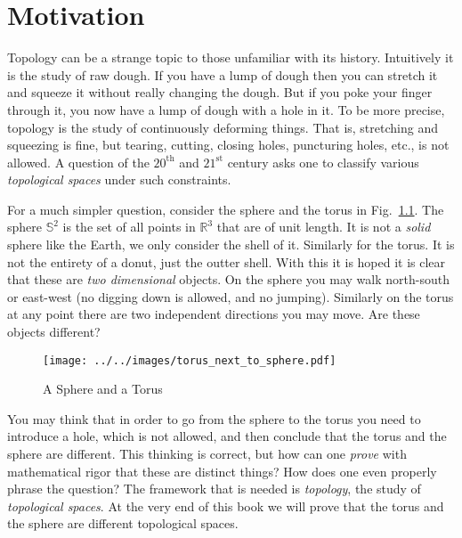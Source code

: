 \chapter{Motivation}
    Topology can be a strange topic to those unfamiliar with its history.
    Intuitively it is the study of raw dough. If you have a lump of
    dough then you can stretch it and squeeze it without really changing the
    dough. But if you poke your finger through it, you now have a lump of dough
    with a hole in it. To be more precise, topology is the study of continuously
    deforming things. That is, stretching and squeezing is fine, but tearing,
    cutting, closing holes, puncturing holes, etc., is not allowed. A question
    of the $20^{\textrm{th}}$ and $21^{\textrm{st}}$ century asks one to
    classify various \textit{topological spaces} under such constraints.
    \par\hfill\par
    For a much simpler question, consider the sphere and the torus in
    Fig.~\ref{fig:sphere_and_torus}. The sphere $\mathbb{S}^{2}$ is the set of
    all points in $\mathbb{R}^{3}$ that are of unit length. It is not a
    \textit{solid} sphere like the Earth, we only consider the shell of it.
    Similarly for the torus. It is not the entirety of a donut, just the outter
    shell. With this it is hoped it is clear that these are
    \textit{two dimensional} objects. On the sphere you may walk north-south or
    east-west (no digging down is allowed, and no jumping). Similarly
    on the torus at any point there are two independent directions you may
    move. Are these objects different?
    \begin{figure}[H]
        \centering
        \texttt{[image: ../../images/torus\_next\_to\_sphere.pdf]}
        \caption{A Sphere and a Torus}
        \label{fig:sphere_and_torus}
    \end{figure}
    You may think that in order to go from the sphere to the torus you need to
    introduce a hole, which is not allowed, and then conclude that the torus
    and the sphere are different. This thinking is correct,
    but how can one \textit{prove} with mathematical rigor that these are
    distinct things? How does one even properly phrase the question? The
    framework that is needed is \textit{topology}, the study of
    \textit{topological spaces}. At the very end of this book we will prove that
    the torus and the sphere are different topological spaces.
    \par\hfill\par
